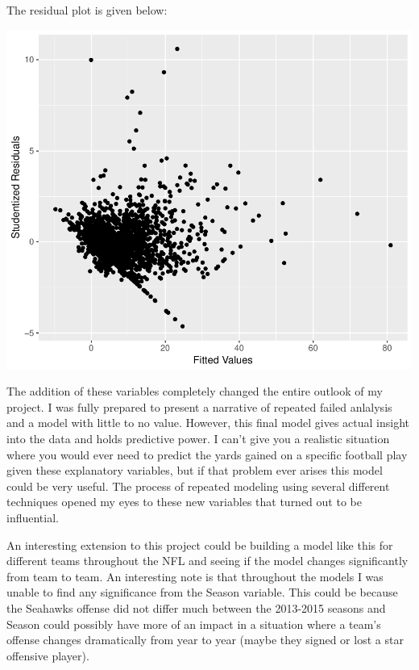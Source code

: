 \documentclass{article}
\begin{document}
\newpage

The residual plot is given below:

\includegraphics{project4-017}

The addition of these variables completely changed the entire outlook of my project. I was fully prepared to present a narrative of repeated failed anlalysis and a model with little to no value. However, this final model gives actual insight into the data and holds predictive power. I can't give you a realistic situation where you would ever need to predict the yards gained on a specific football play given these explanatory variables, but if that problem ever arises this model could be very useful. The process of repeated modeling using several different techniques opened my eyes to these new variables that turned out to be influential. 

An interesting extension to this project could be building a model like this for different teams throughout the NFL and seeing if the model changes significantly from team to team. An interesting note is that throughout the models I was unable to find any significance from the Season variable. This could be because the Seahawks offense did not differ much between the 2013-2015 seasons and Season could possibly have more of an impact in a situation where a team's offense changes dramatically from year to year (maybe they signed or lost a star offensive player). 
\end{document}
